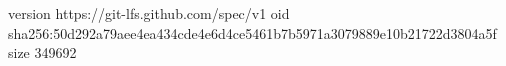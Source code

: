 version https://git-lfs.github.com/spec/v1
oid sha256:50d292a79aee4ea434cde4e6d4ce5461b7b5971a3079889e10b21722d3804a5f
size 349692
